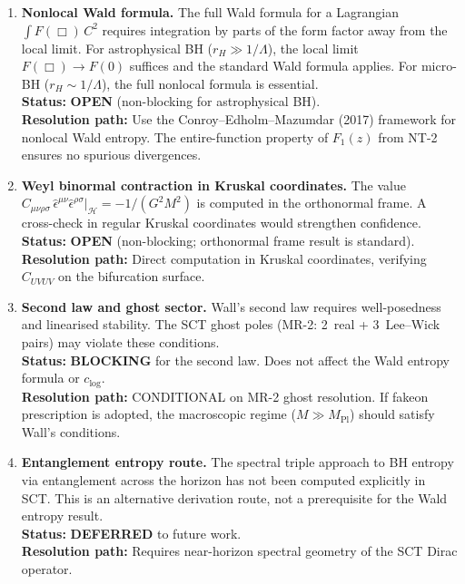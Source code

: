 \documentclass[12pt,a4paper]{article}
\theoremstyle{definition}
\theoremstyle{remark}
\begin{document}
\begin{enumerate}[label=\textbf{G\arabic*:},leftmargin=3em]

\item \textbf{Nonlocal Wald formula.}
  The full Wald formula for a Lagrangian $\int F(\Box)\,C^2$ requires
  integration by parts of the form factor away from the local limit.
  For astrophysical BH ($r_H \gg 1/\Lambda$), the local limit
  $F(\Box) \to F(0)$ suffices and the standard Wald formula applies.
  For micro-BH ($r_H \sim 1/\Lambda$), the full nonlocal formula is
  essential.\\
  \textbf{Status:} \textcolor{orange!80!black}{\textbf{OPEN}}
  (non-blocking for astrophysical BH).\\
  \textbf{Resolution path:} Use the Conroy--Edholm--Mazumdar (2017)
  framework for nonlocal Wald entropy.  The entire-function property
  of $F_1(z)$ from NT-2 ensures no spurious divergences.

\item \textbf{Weyl binormal contraction in Kruskal coordinates.}
  The value $C_{\mu\nu\rho\sigma}\,\hat{\epsilon}^{\mu\nu}
  \hat{\epsilon}^{\rho\sigma}|_{\mathcal{H}} = -1/(G^2 M^2)$
  is computed in the orthonormal frame.  A cross-check in
  regular Kruskal coordinates would strengthen confidence.\\
  \textbf{Status:} \textcolor{orange!80!black}{\textbf{OPEN}}
  (non-blocking; orthonormal frame result is standard).\\
  \textbf{Resolution path:} Direct computation in Kruskal
  coordinates, verifying $C_{UVUV}$ on the bifurcation surface.

\item \textbf{Second law and ghost sector.}
  Wall's second law requires well-posedness and linearised stability.
  The SCT ghost poles (MR-2: 2~real + 3~Lee--Wick pairs) may violate
  these conditions.\\
  \textbf{Status:} \textcolor{red!80!black}{\textbf{BLOCKING}}
  for the second law.  Does not affect the Wald entropy formula
  or $c_{\log}$.\\
  \textbf{Resolution path:} CONDITIONAL on MR-2 ghost resolution.
  If fakeon prescription is adopted, the macroscopic regime
  ($M \gg M_{\mathrm{Pl}}$) should satisfy Wall's conditions.

\item \textbf{Entanglement entropy route.}
  The spectral triple approach to BH entropy via entanglement
  across the horizon has not been computed explicitly in SCT.
  This is an alternative derivation route, not a prerequisite
  for the Wald entropy result.\\
  \textbf{Status:} \textcolor{blue!60!black}{\textbf{DEFERRED}}
  to future work.\\
  \textbf{Resolution path:} Requires near-horizon spectral
  geometry of the SCT Dirac operator.


\end{enumerate}
\end{document}
